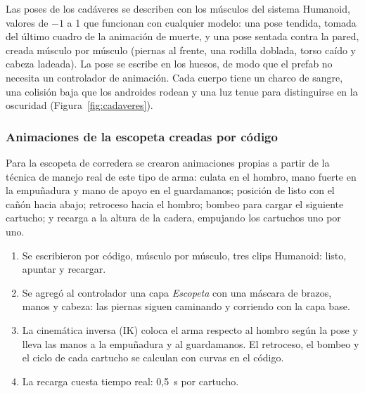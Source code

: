 Las poses de los cadáveres se describen con los músculos del sistema Humanoid, valores de $-1$ a 1
que funcionan con cualquier modelo: una pose tendida, tomada del último cuadro de la animación de
muerte, y una pose sentada contra la pared, creada músculo por músculo (piernas al frente, una
rodilla doblada, torso caído y cabeza ladeada). La pose se escribe en los huesos, de modo que el
prefab no necesita un controlador de animación. Cada cuerpo tiene un charco de sangre, una
colisión baja que los androides rodean y una luz tenue para distinguirse en la oscuridad
(Figura~\ref{fig:cadaveres}).


\subsubsection{Animaciones de la escopeta creadas por código}

Para la escopeta de corredera se crearon animaciones propias a partir de la técnica de manejo real
de este tipo de arma: culata en el hombro, mano fuerte en la empuñadura y mano de apoyo en el
guardamanos; posición de listo con el cañón hacia abajo; retroceso hacia el hombro; bombeo para
cargar el siguiente cartucho; y recarga a la altura de la cadera, empujando los cartuchos uno por
uno.

\begin{enumerate}
  \item Se escribieron por código, músculo por músculo, tres clips Humanoid: listo, apuntar y
        recargar.
  \item Se agregó al controlador una capa \textit{Escopeta} con una máscara de brazos, manos y
        cabeza: las piernas siguen caminando y corriendo con la capa base.
  \item La cinemática inversa (IK) coloca el arma respecto al hombro según la pose y lleva las
        manos a la empuñadura y al guardamanos. El retroceso, el bombeo y el ciclo de cada cartucho
        se calculan con curvas en el código.
  \item La recarga cuesta tiempo real: 0,5~s por cartucho.
\end{enumerate}


